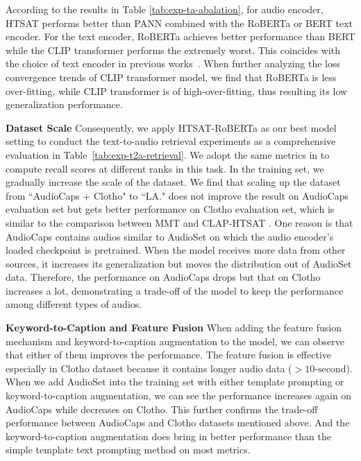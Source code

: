 According to the results in Table \ref{tab:exp-ta-abalation}, for audio encoder, HTSAT performs better than PANN combined with the RoBERTa or BERT text encoder. For the text encoder, RoBERTa achieves better performance than BERT while the CLIP transformer performs the extremely worst. This coincides with the choice of text encoder in previous works~\cite{ml-act,clap}. When further analyzing the loss convergence trends of CLIP transformer model, we find that RoBERTa is less over-fitting, while CLIP transformer is of high-over-fitting, thus resulting its low generalization performance. 

\vspace{0.05cm}
\noindent \textbf{Dataset Scale} Consequently, we apply HTSAT-RoBERTa as our best model setting to conduct the text-to-audio retrieval experiments as a comprehensive evaluation in Table~\ref{tab:exp-t2a-retrieval}. We adopt the same metrics in \cite{ml-act,mmt} to compute recall scores at different ranks in this task. In the training set, we gradually increase the scale of the dataset.
We find that scaling up the dataset from ``AudioCaps + Clotho" to ``LA." does not improve the result on AudioCaps evaluation set but gets better performance on Clotho evaluation set, which is similar to the comparison between MMT \cite{mmt} and CLAP-HTSAT \cite{clap-retrieval}. One reason is that AudioCaps contains audios similar to AudioSet on which the audio encoder's loaded checkpoint is pretrained. When the model receives more data from other sources, it increases its generalization but moves the distribution out of AudioSet data. Therefore, the performance on AudioCaps drops but that on Clotho increases a lot, demonstrating a trade-off of the model to keep the performance among different types of audios. 

\vspace{0.05cm}
\noindent \textbf{Keyword-to-Caption and Feature Fusion} When adding the feature fusion mechanism and keyword-to-caption augmentation to the model, we can observe that either of them improves the performance. The feature fusion is effective especially in Clotho dataset because it contains longer audio data ($>10\text{-second}$). When we add AudioSet into the training set with either template prompting or keyword-to-caption augmentation, we can see the performance increases again on AudioCaps while decreases on Clotho. This further confirms the trade-off performance between AudioCaps and Clotho datasets mentioned above. And the keyword-to-caption augmentation does bring in better performance than the simple template text prompting method on most metrics.

